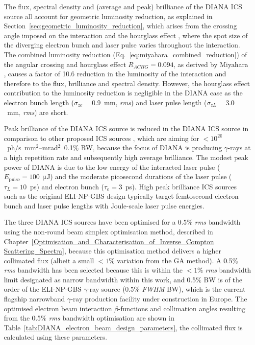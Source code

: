 \documentclass[../main.tex]{subfiles}
\begin{document}
The flux, spectral density and (average and peak) brilliance of the DIANA ICS source all account for geometric luminosity reduction, as explained in Section~\ref{sec:geometric_luminosity_reduction}, which arises from the crossing angle imposed on the interaction and the hourglass effect \cite{furman1991hourglass}, where the spot size of the diverging electron bunch and laser pulse varies throughout the interaction. The combined luminosity reduction (Eq.~\ref{eq:miyahara_combined_reduction}) of the angular crossing and hourglass effect $R_{ACHG}=0.094$, as derived by Miyahara \cite{miyahara2008luminosity}, causes a factor of 10.6 reduction in the luminosity of the interaction and therefore to the flux, brilliance and spectral density. However, the hourglass effect contribution to the luminosity reduction is negligible in the DIANA case as the electron bunch length ($\sigma_{ze}=0.9$~\si{\milli\meter}, \textit{rms}) and laser pulse length ($\sigma_{zL}=3.0$~\si{\milli\meter}, \textit{rms}) are short.  

Peak brilliance of the DIANA ICS source is reduced in the DIANA ICS source in comparison to other proposed ICS sources \cite{barty2011overview}, which are aiming for $<10^{20}$~ph/\si{\second}~\si{\milli\meter}$^{2}$--\si{\milli\radian}$^{2}$~0.1\% BW,  because the focus of DIANA is producing $\gamma$-rays at a high repetition rate and subsequently high average brilliance. The modest peak power of DIANA is due to the low energy of the interacted laser pulse ($E_{\mathrm{pulse}} = 100$~\si{\micro\joule}) and the moderate picosecond durations of the laser pulse ($\tau_{L}=10$~\si{\pico\second}) and electron bunch ($\tau_{e}=3$~\si{\pico\second}). High peak brilliance ICS sources such as the original ELI-NP-GBS design \cite{adriani2014technical} typically target femtosecond electron bunch and laser pulse lengths with Joule-scale laser pulse energies. 

The three DIANA ICS sources have been optimised for a 0.5\% \textit{rms} bandwidth using the non-round beam simplex optimisation method, described in Chapter~\ref{Optimisation_and_Characterisation_of_Inverse_Compton Scattering_Spectra}, because this optimisation method delivers a higher collimated flux (albeit a small $<1$\% variation from the GA method). A 0.5\% \textit{rms} bandwidth has been selected because this is within the $<1$\% \textit{rms} bandwidth limit designated as narrow bandwidth within this work, and 0.5\%  BW is of the order of the ELI-NP-GBS $\gamma$-ray source \cite{elinp2019vega,tanaka2020current} (0.5\% \textit{FWHM} BW), which is the current flagship narrowband $\gamma$-ray production facility under construction in Europe. The optimised electron beam interaction $\beta$-functions and collimation angles resulting from the 0.5\% \textit{rms} bandwidth optimisation are shown in Table~\ref{tab:DIANA_electron_beam_design_parameters}, the collimated flux is calculated using these parameters.
\end{document}
